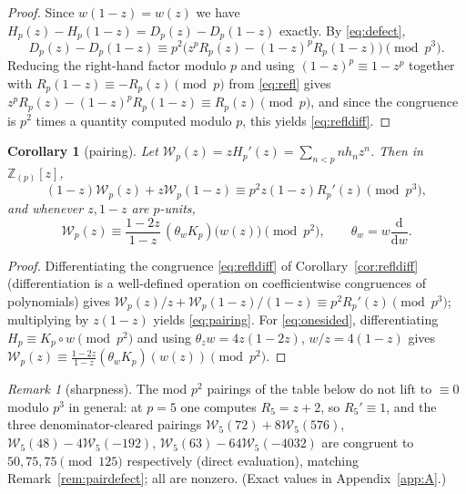 \documentclass[11pt]{amsart}
\newtheorem{corollary}[theorem]{Corollary}
\theoremstyle{definition}
\theoremstyle{remark}
\newtheorem{remark}[theorem]{Remark}
\newcommand{\dd}{\mathrm{d}}
\newcommand{\Zp}{\mathbb{Z}_{(p)}}
\begin{document}
\begin{proof}
Since $w(1-z)=w(z)$ we have
$H_p(z)-H_p(1-z)=D_p(z)-D_p(1-z)$ exactly. By \eqref{eq:defect},
\[
D_p(z)-D_p(1-z)\equiv
p^2\bigl(z^pR_p(z)-(1-z)^pR_p(1-z)\bigr)\pmod{p^3}.
\]
Reducing the right-hand factor modulo $p$ and using
$(1-z)^p\equiv1-z^p$ together with $R_p(1-z)\equiv-R_p(z)\pmod p$
from \eqref{eq:refl} gives
$z^pR_p(z)-(1-z)^pR_p(1-z)\equiv R_p(z)\pmod p$, and since the
congruence is $p^2$ times a quantity computed modulo $p$, this yields
\eqref{eq:refldiff}.
\end{proof}

\begin{corollary}[pairing]\label{cor:pair}
Let $\mathcal W_p(z)=zH_p'(z)=\sum_{n<p}nh_nz^n$. Then in $\Zp[z]$,
\begin{equation}\label{eq:pairing}
(1-z)\mathcal W_p(z)+z\mathcal W_p(1-z)
\equiv p^2z(1-z)R_p'(z)\pmod{p^3},
\end{equation}
and whenever $z,1-z$ are $p$-units,
\begin{equation}\label{eq:onesided}
\mathcal W_p(z)\equiv\frac{1-2z}{1-z}\,(\theta_wK_p)\bigl(w(z)\bigr)
\pmod{p^2},
\qquad \theta_w=w\frac{\dd}{\dd w}.
\end{equation}
\end{corollary}

\begin{proof}
Differentiating the congruence \eqref{eq:refldiff} of
Corollary~\ref{cor:refldiff} (differentiation is a well-defined
operation on coefficientwise congruences of polynomials) gives
$\mathcal W_p(z)/z+\mathcal W_p(1-z)/(1-z)\equiv p^2R_p'(z)\pmod{p^3}$;
multiplying by $z(1-z)$ yields \eqref{eq:pairing}. For
\eqref{eq:onesided}, differentiating $H_p\equiv K_p\circ w\pmod{p^2}$
and using $\theta_z w=4z(1-2z)$, $w/z=4(1-z)$ gives
$\mathcal W_p(z)\equiv\frac{1-2z}{1-z}(\theta_wK_p)(w(z))\pmod{p^2}$.
\end{proof}

\begin{remark}[sharpness]\label{rem:sharp}
The mod $p^2$ pairings of the table below do not lift to $\equiv0$
modulo $p^3$ in general: at $p=5$ one computes $R_5=z+2$, so
$R_5'\equiv1$, and the three denominator-cleared pairings
$\mathcal W_5(72)+8\mathcal W_5(576)$,
$\mathcal W_5(48)-4\mathcal W_5(-192)$,
$\mathcal W_5(63)-64\mathcal W_5(-4032)$ are congruent to
$50,75,75\pmod{125}$ respectively (direct evaluation), matching
Remark~\ref{rem:pairdefect}; all are nonzero. (Exact values in
Appendix~\ref{app:A}.)
\end{remark}
\end{document}
